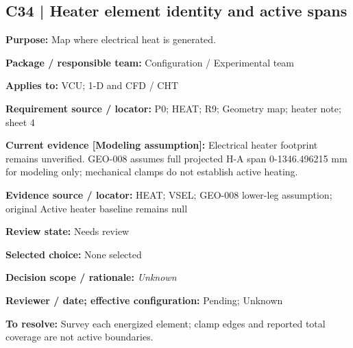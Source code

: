 \documentclass[11pt]{article}
\begin{document}
\par\noindent\begin{minipage}{\textwidth}\small\setlength{\parskip}{2pt}
\subsection*{C34 | Heater element identity and active spans}
\textbf{Purpose:} Map where electrical heat is generated.\par
\textbf{Package / responsible team:} Configuration / Experimental team\par
\textbf{Applies to:} VCU; 1-D and CFD / CHT\par
\textbf{Requirement source / locator:} P0; HEAT; R9; Geometry map; heater note; sheet 4\par
\textbf{Current evidence [Modeling assumption]:} Electrical heater footprint remains unverified. GEO-008 assumes full projected H-A span 0-1346.496215 mm for modeling only; mechanical clamps do not establish active heating.\par
\textbf{Evidence source / locator:} HEAT; VSEL; GEO-008 lower-leg assumption; original Active heater baseline remains null\par
\textbf{Review state:} Needs review\par
\textbf{Selected choice:} None selected\par
\textbf{Decision scope / rationale:} \textit{Unknown}\par
\textbf{Reviewer / date; effective configuration:} Pending; Unknown\par
\textbf{To resolve:} Survey each energized element; clamp edges and reported total coverage are not active boundaries.\par
\end{minipage}\par\vspace{5pt}
\end{document}
